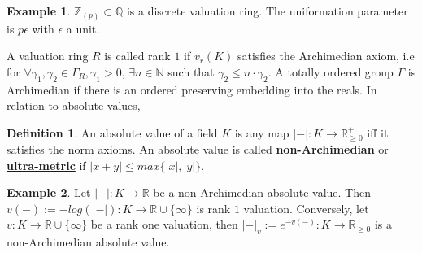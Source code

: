 \documentclass{article}
\theoremstyle{definition}
\theoremstyle{definition}
\theoremstyle{definition}
\theoremstyle{definition}
\theoremstyle{definition}
\newtheorem{definition}{Definition}[section]
\theoremstyle{definition}
\theoremstyle{definition}
\newtheorem{example}{Example}[section]
\begin{document}
\begin{tcolorbox}[colback=yellow!5!white,colframe=yellow!30!white]
\begin{example}
$\mathbb{Z}_{(p)}\subset \mathbb{Q}$ is a discrete valuation ring. The uniformation parameter is $p\epsilon$ with $\epsilon$ a unit. 
\end{example}
\end{tcolorbox}
A valuation ring $R$ is called rank $1$ if $v_r(K)$ satisfies the Archimedian axiom, i.e for $\forall \gamma_1,\gamma_2\in \Gamma_R, \gamma_1>0$, $\exists n\in \mathbb{N}$ such that $\gamma_2\leq n\cdot \gamma_2$. A totally ordered group $\Gamma$ is Archimedian if there is an ordered preserving embedding into the reals. In relation to absolute values,


\begin{tcolorbox}[colback=purple!5!white,colframe=purple!75!black]
\begin{definition}
An absolute value of a field $K$ is any map $|-|: K\to \mathbb{R}_{\geq 0}^+$ iff it satisfies the norm axioms. An absolute value is called \underline{\textbf{non-Archimedian}} or \underline{\textbf{ultra-metric}} if $|x+y|\leq max\{|x|,|y|\}$.
\end{definition}
\end{tcolorbox}


\begin{tcolorbox}[colback=yellow!5!white,colframe=yellow!30!white]
\begin{example}
    Let $|-|: K\to \mathbb{R}$ be a non-Archimedian absolute value. Then $v(-):=- log(|-|):K\to \mathbb{R}\cup \{\infty\} $ is rank $1$ valuation. Conversely, let $v: K\to \mathbb{R}\cup \{\infty\}$ be a rank one valuation, then $|-|_{v}:=e^{-v(-)}: K\to \mathbb{R}_{\geq 0}$ is a non-Archimedian absolute value. 
\end{example}
\end{tcolorbox}
\end{document}
